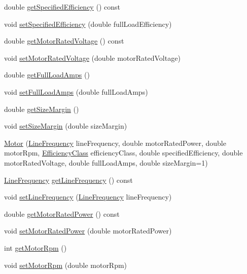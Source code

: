 \begin{DoxyCompactItemize}
\item 
double \hyperlink{class_motor_aca202d3c2061bd8c19e1819331033e36}{get\+Specified\+Efficiency} () const
\item 
void \hyperlink{class_motor_a0a096ec5fc2b7e8ee40b4e7b30e5f337}{set\+Specified\+Efficiency} (double full\+Load\+Efficiency)
\item 
double \hyperlink{class_motor_a3fedfc960a6970508b39999c58d44cc6}{get\+Motor\+Rated\+Voltage} () const
\item 
void \hyperlink{class_motor_aab754019236e34cba0acd3632567515e}{set\+Motor\+Rated\+Voltage} (double motor\+Rated\+Voltage)
\item 
double \hyperlink{class_motor_a612eb0dabb9623ee8e0866046527d16a}{get\+Full\+Load\+Amps} ()
\item 
void \hyperlink{class_motor_a4bc8bf85c7749a0b7ff279d7eef20a2e}{set\+Full\+Load\+Amps} (double full\+Load\+Amps)
\item 
double \hyperlink{class_motor_aff485f55bed5b58d1454ce5c71bc0729}{get\+Size\+Margin} ()
\item 
void \hyperlink{class_motor_ab39a9375d17af151b6f9516674f37928}{set\+Size\+Margin} (double size\+Margin)
\item 
\hyperlink{class_motor_a529cb2685eef1f83ae6a775dd5e50ad9}{Motor} (\hyperlink{class_motor_acee1bdf1b684ad36cb80dc2829d9fcee}{Line\+Frequency} line\+Frequency, double motor\+Rated\+Power, double motor\+Rpm, \hyperlink{class_motor_afa022971ae062406a9f588c601673d4e}{Efficiency\+Class} efficiency\+Class, double specified\+Efficiency, double motor\+Rated\+Voltage, double full\+Load\+Amps, double size\+Margin=1)
\item 
\hyperlink{class_motor_acee1bdf1b684ad36cb80dc2829d9fcee}{Line\+Frequency} \hyperlink{class_motor_a41e71462fe60674a5554e47d0079b0f3}{get\+Line\+Frequency} () const
\item 
void \hyperlink{class_motor_a450e5ecea25b05413b731379f153c3f1}{set\+Line\+Frequency} (\hyperlink{class_motor_acee1bdf1b684ad36cb80dc2829d9fcee}{Line\+Frequency} line\+Frequency)
\item 
double \hyperlink{class_motor_a476d3790492959945b3b75d1638f737f}{get\+Motor\+Rated\+Power} () const
\item 
void \hyperlink{class_motor_aa01f82db13c71b045b05e49f42ba46e9}{set\+Motor\+Rated\+Power} (double motor\+Rated\+Power)
\item 
int \hyperlink{class_motor_a13826c93b894d699478e34a98ffb35ab}{get\+Motor\+Rpm} ()
\item 
void \hyperlink{class_motor_ac0fda674bd40e24bb864e8256fb5ba32}{set\+Motor\+Rpm} (double motor\+Rpm)

\end{DoxyCompactItemize}
